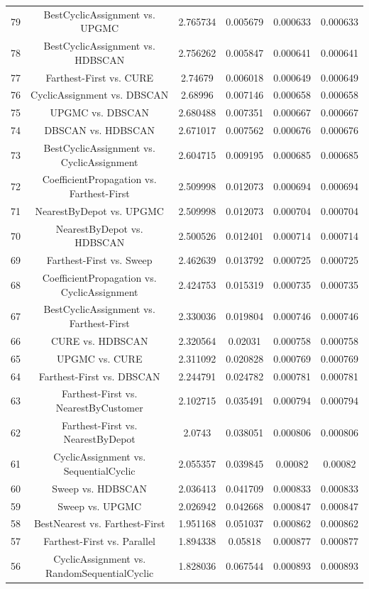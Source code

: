 \documentclass[a4paper,10pt]{article}
\begin{document}
\begin{landscape}
\begin{table}[!htp]
\begin{tabular}{cccccc}
79&BestCyclicAssignment vs. UPGMC&2.765734&0.005679&0.000633&0.000633\\
78&BestCyclicAssignment vs. HDBSCAN&2.756262&0.005847&0.000641&0.000641\\
77&Farthest-First vs. CURE&2.74679&0.006018&0.000649&0.000649\\
76&CyclicAssignment vs. DBSCAN&2.68996&0.007146&0.000658&0.000658\\
75&UPGMC vs. DBSCAN&2.680488&0.007351&0.000667&0.000667\\
74&DBSCAN vs. HDBSCAN&2.671017&0.007562&0.000676&0.000676\\
73&BestCyclicAssignment vs. CyclicAssignment&2.604715&0.009195&0.000685&0.000685\\
72&CoefficientPropagation vs. Farthest-First&2.509998&0.012073&0.000694&0.000694\\
71&NearestByDepot vs. UPGMC&2.509998&0.012073&0.000704&0.000704\\
70&NearestByDepot vs. HDBSCAN&2.500526&0.012401&0.000714&0.000714\\
69&Farthest-First vs. Sweep&2.462639&0.013792&0.000725&0.000725\\
68&CoefficientPropagation vs. CyclicAssignment&2.424753&0.015319&0.000735&0.000735\\
67&BestCyclicAssignment vs. Farthest-First&2.330036&0.019804&0.000746&0.000746\\
66&CURE vs. HDBSCAN&2.320564&0.02031&0.000758&0.000758\\
65&UPGMC vs. CURE&2.311092&0.020828&0.000769&0.000769\\
64&Farthest-First vs. DBSCAN&2.244791&0.024782&0.000781&0.000781\\
63&Farthest-First vs. NearestByCustomer&2.102715&0.035491&0.000794&0.000794\\
62&Farthest-First vs. NearestByDepot&2.0743&0.038051&0.000806&0.000806\\
61&CyclicAssignment vs. SequentialCyclic&2.055357&0.039845&0.00082&0.00082\\
60&Sweep vs. HDBSCAN&2.036413&0.041709&0.000833&0.000833\\
59&Sweep vs. UPGMC&2.026942&0.042668&0.000847&0.000847\\
58&BestNearest vs. Farthest-First&1.951168&0.051037&0.000862&0.000862\\
57&Farthest-First vs. Parallel&1.894338&0.05818&0.000877&0.000877\\
56&CyclicAssignment vs. RandomSequentialCyclic&1.828036&0.067544&0.000893&0.000893\\

\end{tabular}
\end{table}
\end{landscape}
\end{document}
